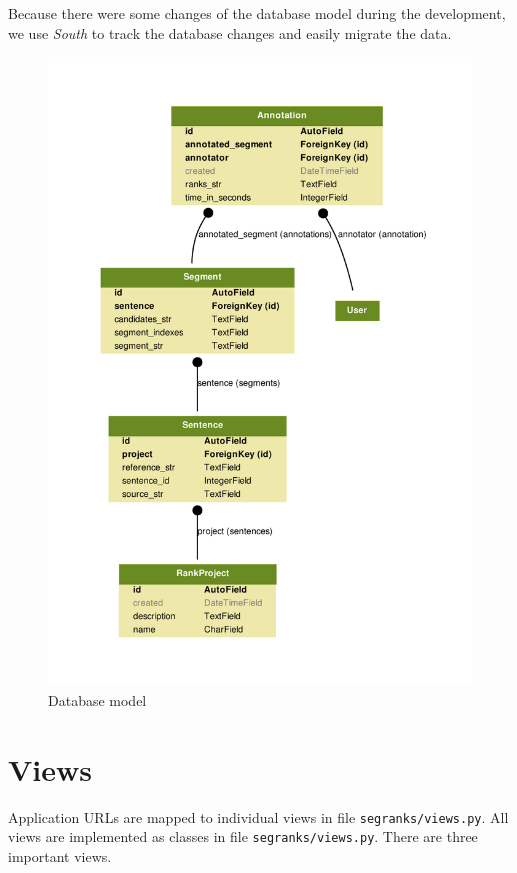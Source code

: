 Because there were some changes of the database model during the development,
we use \textit{South} to track the database changes and easily migrate the
data.

\begin{figure}
    \begin{center}
        \includegraphics[width=12cm]{img/model.pdf}
    \end{center}

    \caption{Database model}
    \label{model}
\end{figure}

\section{Views}

Application URLs are mapped to individual views in file
\texttt{segranks/views.py}. All views are implemented as classes in file
\texttt{segranks/views.py}. There are three important views.

